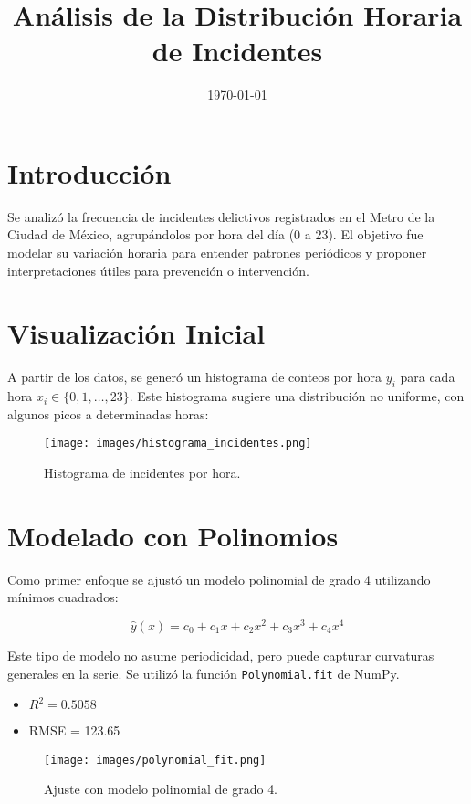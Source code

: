 \documentclass[a4paper,12pt]{article}
\title{Análisis de la Distribución Horaria de Incidentes}
\author{}
\date{\today}
\begin{document}
\maketitle

\section{Introducción}

Se analizó la frecuencia de incidentes delictivos registrados en el Metro de la Ciudad de México, agrupándolos por hora del día (0 a 23). El objetivo fue modelar su variación horaria para entender patrones periódicos y proponer interpretaciones útiles para prevención o intervención.

\section{Visualización Inicial}

A partir de los datos, se generó un histograma de conteos por hora \( y_i \) para cada hora \( x_i \in \{0,1,\ldots,23\} \). Este histograma sugiere una distribución no uniforme, con algunos picos a determinadas horas:

\begin{figure}[H]
    \centering
    \texttt{[image: images/histograma\_incidentes.png]}
    \caption{Histograma de incidentes por hora.}
\end{figure}

\section{Modelado con Polinomios}

Como primer enfoque se ajustó un modelo polinomial de grado 4 utilizando mínimos cuadrados:

\[
\hat{y}(x) = c_0 + c_1 x + c_2 x^2 + c_3 x^3 + c_4 x^4
\]

Este tipo de modelo no asume periodicidad, pero puede capturar curvaturas generales en la serie. Se utilizó la función \texttt{Polynomial.fit} de NumPy.

\begin{itemize}
    \item \( R^2 = 0.5058 \)
    \item RMSE = 123.65
\end{itemize}

\begin{figure}[H]
    \centering
    \texttt{[image: images/polynomial\_fit.png]}
    \caption{Ajuste con modelo polinomial de grado 4.}
\end{figure}
\end{document}
